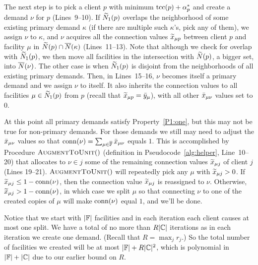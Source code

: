 \documentclass[11pt]{article}
\begin{document}


The next step is to pick a client $p$ with minimum
$\textrm{tcc}(p)+\alpha_p^\ast$ and create a demand $\nu$ for $p$
(Lines~9--10). If ${\widetilde N}_1(p)$ overlaps the neighborhood
of some existing primary demand $\kappa$ (if there are
multiple such $\kappa$'s, pick any of them), we assign $\nu$
to $\kappa$, and $\nu$ acquires all the connection values
${\widetilde x}_{\mu p}$ between client $p$ and facility $\mu$ in
${\widetilde N}(p)\cap {\overline{N}}(\kappa)$ (Lines~11--13). Note that
although we check for overlap with ${\widetilde N}_1(p)$, we then
move all facilities in the intersection with ${\widetilde N}(p)$,
a bigger set, into ${\overline{N}}(\nu)$.  The other case is when
${\widetilde N}_1(p)$ is disjoint from the neighborhoods of all
existing primary demands. Then, in Lines~15--16, $\nu$
becomes itself a primary demand and we assign $\nu$ to
itself. It also inherits the connection values to all
facilities $\mu\in{\widetilde N}_1(p)$ from $p$ (recall that
${\widetilde x}_{\mu p} = {\bar y}_{\mu}$), with all other
${\bar x}_{\mu\nu}$ values set to $0$.

At this point all primary demands satisfy
Property~\ref{P1:one}, but this may not be true for
non-primary demands. For those demands we still may need to
adjust the ${\bar x}_{\mu\nu}$ values so that ${\textrm{conn}}(\nu) =
\sum_{\mu\in\overline{\mathbb{F}}}{\bar x}_{\mu \nu}$ equals $1$. This
is accomplished by Procedure ${\textsc{AugmentToUnit}}()$ (definition
in Pseudocode~\ref{alg:helper}, Line~10--20) that allocates
to $\nu\in j$ some of the remaining connection values
${\widetilde x}_{\mu j}$ of client $j$ (Lines 19--21).
${\textsc{AugmentToUnit}}()$ will repeatedly pick any $\mu$ with
${\widetilde x}_{\mu j} >0$.  If ${\widetilde x}_{\mu j} \leq
1-{\textrm{conn}}(\nu)$, then the connection value ${\widetilde x}_{\mu
  j}$ is reassigned to $\nu$. Otherwise, ${\widetilde x}_{\mu j} >
1-{\textrm{conn}}(\nu)$, in which case we split $\mu$ so that
connecting $\nu$ to one of the created copies of $\mu$ will
make ${\textrm{conn}}(\nu)$ equal $1$, and we'll be done.

\smallskip

Notice that we start with $|\mathbb{F}|$ facilities and in each
iteration each client causes at most one split. We have a total of no more
than $R|\mathbb{C}|$ iterations as in each iteration we create
one demand. (Recall that $R = \max_jr_j$.)
So the total number of facilities we created
will be at most $|\mathbb{F}|+ R|\mathbb{C}|^2$, which is
polynomial in $|\mathbb{F}|+|\mathbb{C}|$ due to our earlier bound on $R$.


\medskip
\end{document}
